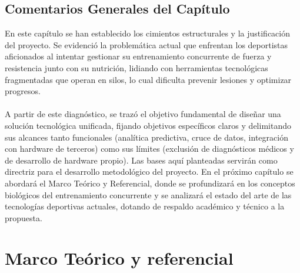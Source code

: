\documentclass[12pt]{article}
\begin{document}
\subsection{Comentarios Generales del Capítulo}
En este capítulo se han establecido los cimientos estructurales y la justificación del proyecto. Se evidenció la problemática actual que enfrentan los deportistas aficionados al intentar gestionar su entrenamiento concurrente de fuerza y resistencia junto con su nutrición, lidiando con herramientas tecnológicas fragmentadas que operan en silos, lo cual dificulta prevenir lesiones y optimizar progresos.
\\\\
A partir de este diagnóstico, se trazó el objetivo fundamental de diseñar una solución tecnológica unificada, fijando objetivos específicos claros y delimitando sus alcances tanto funcionales (analítica predictiva, cruce de datos, integración con hardware de terceros) como sus límites (exclusión de diagnósticos médicos y de desarrollo de hardware propio). Las bases aquí planteadas servirán como directriz para el desarrollo metodológico del proyecto. En el próximo capítulo se abordará el Marco Teórico y Referencial, donde se profundizará en los conceptos biológicos del entrenamiento concurrente y se analizará el estado del arte de las tecnologías deportivas actuales, dotando de respaldo académico y técnico a la propuesta.
\section{Marco Teórico y referencial}
\end{document}
